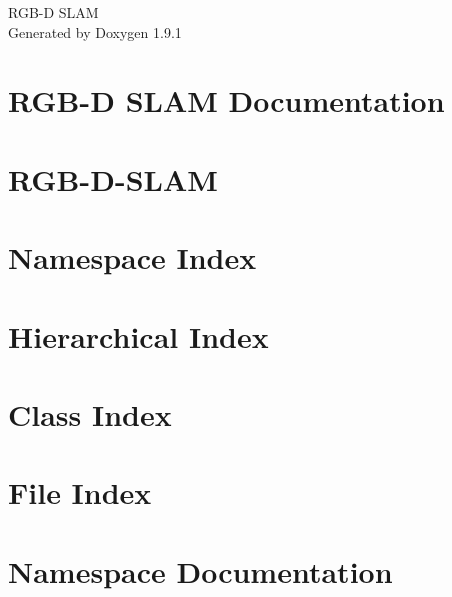 \let\mypdfximage\pdfximage\def\pdfximage{\immediate\mypdfximage}\documentclass[twoside]{book}
\newcommand{\+}{\discretionary{\mbox{\scriptsize$\hookleftarrow$}}{}{}}
\newcommand{\clearemptydoublepage}{%
  \newpage{\pagestyle{empty}\cleardoublepage}%
}
\begin{document}
\raggedbottom

\hypersetup{pageanchor=false,
             bookmarksnumbered=true,
             pdfencoding=unicode
            }
\begin{titlepage}
\vspace*{7cm}
\begin{center}%
{\Large RGB-\/D SLAM }\\
\vspace*{1cm}
{\large Generated by Doxygen 1.9.1}\\
\end{center}
\end{titlepage}
\clearemptydoublepage
{}
\tableofcontents
\clearemptydoublepage
{}
\hypersetup{pageanchor=true}

\chapter{RGB-\/D SLAM Documentation}
\label{index}\hypertarget{index}{}
\chapter{RGB-\/\+D-\/\+SLAM}
\label{md__home_baptou__documents_code_robots__r_g_b__s_l_a_m__r_g_b__d__s_l_a_m__r_e_a_d_m_e}

\chapter{Namespace Index}

\chapter{Hierarchical Index}

\chapter{Class Index}

\chapter{File Index}

\chapter{Namespace Documentation}


\end{document}
